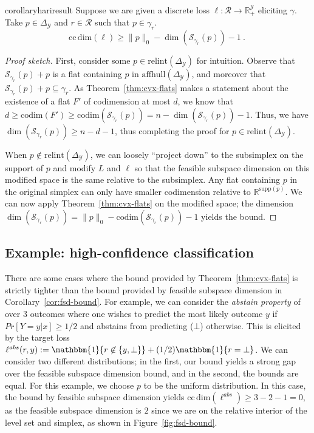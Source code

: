 \documentclass{article}
\newcommand{\Comments}{1}
\newcommand{\mytodo}[2]{\ifnum\Comments=1%
	\todo[linecolor=#1!80!black,backgroundcolor=#1,bordercolor=#1!80!black]{#2}\fi}
\newcommand{\raft}[1]{\mytodo{green!20!white}{RF: #1}}
\newcommand{\jessiet}[1]{\mytodo{purple!20!white}{JF: #1}}
\newcommand{\reals}{\mathbb{R}}
\newcommand{\simplex}{\Delta_\Y}
\newcommand{\relint}[1]{\mathrm{relint}(#1)}
\newcommand{\ccdim}{\mathrm{cc\,dim}}
\newcommand{\codim}{\mathrm{codim}}
\newcommand{\supp}{\mathrm{supp}}
\newcommand{\affhull}{\mathrm{affhull}}
\newcommand{\R}{\mathcal{R}}
\newcommand{\Sc}{\mathcal{S}}  %
\newcommand{\Y}{\mathcal{Y}}
\begin{document}
\begin{restatable}{corollary}{hariresult}\label{cor:fsd-bound}
	Suppose we are given a discrete loss $\ell:\R \to \reals^\Y_+$ eliciting $\gamma$.
	Take $p \in \simplex$ and $r \in \R$ such that $p \in \gamma_r$.
	\begin{equation}
	\ccdim(\ell) \geq \|p\|_0 - \dim(\Sc_{\gamma_r}(p)) - 1~.~
	\end{equation}
\end{restatable}
\begin{proof}[Proof sketch]
	First, consider some $p \in \relint{\simplex}$ for intuition.
	Observe that $\Sc_{\gamma_r}(p) + p$ is a flat containing $p$ in $\affhull(\simplex)$, and moreover that  $\Sc_{\gamma_r}(p) + p \subseteq \gamma_r$.
	As Theorem~\ref{thm:cvx-flats} makes a statement about the existence of a flat $F'$ of codimension at most $d$, we know that $d \geq \codim(F') \geq \codim(\Sc_{\gamma_r}(p)) = n- \dim(\Sc_{\gamma_r}(p)) - 1$.
	Thus, we have $\dim(\Sc_{\gamma_r}(p)) \geq n - d - 1$, thus completing the proof for $p \in \relint{\simplex}$.
	
	When $p \not \in \relint{\simplex}$, we can loosely ``project down'' to the subsimplex on the support of $p$ and modify $L$ and $\ell$ so that the feasible subspace dimension on this modified space is the same relative to the subsimplex.
	Any flat containing $p$ in the original simplex can only have smaller codimension relative to $\reals^{\supp(p)}$.
	We can now apply Theorem~\ref{thm:cvx-flats} on the modified space; the dimension $\dim(\Sc_{\gamma_r}(p)) = \|p\|_0 - \codim(\Sc_{\gamma_r}(p)) - 1$ yields the bound.
\end{proof}

\subsection{Example: high-confidence classification}\label{subsec:examples-finite}
There are some cases where the bound provided by Theorem~\ref{thm:cvx-flats} is strictly tighter than the bound provided by feasible subspace dimension in Corollary~\ref{cor:fsd-bound}.
For example, we can consider the \emph{abstain property} of~\citet{ramaswamy2018consistent} over 3 outcomes where one wishes to predict the most likely outcome $y$ if $Pr[Y=y|x] \geq 1/2$ and abstains from predicting ($\bot$) otherwise.
This is elicited by the target loss $\ell^{abs}(r,y) := \mathbbm{1}\{r \not \in \{y, \bot\}\} + (1/2)\mathbbm{1}\{r = \bot\}$. 
We can consider two different distributions; in the first, our bound yields a strong gap over the feasible subspace dimension bound, and in the second, the bounds are equal.
For this example, we choose $p$ to be the uniform distribution.
In this case, the bound by feasible subspace dimension yields $\ccdim(\ell^{abs}) \geq 3 - 2 - 1 = 0$, as the feasible subspace dimension is $2$ since we are on the relative interior of the level set and simplex, as shown in Figure~\ref{fig:fsd-bound}.
\end{document}
